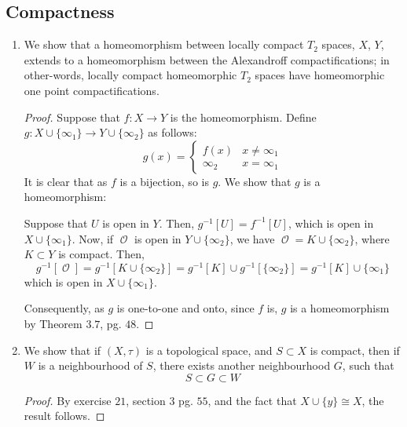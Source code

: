 \documentclass{book}
\DeclareMathOperator*{\Ocal}{\mathcal{O}}
\begin{document}
\subsection{Compactness}
\begin{enumerate}[(1)]

    \item We show that a homeomorphism between locally compact $T_2$ spaces, $X$, $Y$, extends to a homeomorphism between the Alexandroff compactifications; in other-words, locally compact homeomorphic $T_2$ spaces have homeomorphic one point compactifications. 
        \begin{proof} Suppose that $f: X \rightarrow Y$ is the homeomorphism. Define $g: X \cup \{\infty_1\} \rightarrow Y \cup \{\infty_2\}$ as follows: 
            $$ g(x) = 
            \begin{cases} 
                f(x) & x \neq \infty_1 \\
                \infty_2 & x = \infty_1
            \end{cases}
            $$
            It is clear that as $f$ is a bijection, so is $g$. We show that $g$ is a homeomorphism: 
            \par Suppose that $U$ is open in $Y$. Then, $g^{-1}[U] = f^{-1}[U]$, which is open in $X \cup \{\infty_1\}$. Now, if ${\Ocal}$ is open in $Y \cup \{\infty_2\}$, we have ${\Ocal} = K \cup \{\infty_2\}$, where $K \subset Y$ is compact. Then, 
            $$g^{-1}[{\Ocal}] = g^{-1}[K \cup \{\infty_2\}] = g^{-1}[K] \cup g^{-1}[\{\infty_2\}] =g^{-1}[K] \cup \{\infty_1\}$$
            which is open in $X \cup \{\infty_1\}$. 
            \par Consequently, as $g$ is one-to-one and onto, since $f$ is, $g$ is a homeomorphism by Theorem $3.7$, pg. $48$.
        \end{proof}

    \item We show that if $(X, \tau)$ is a topological space, and $S \subset X$ is compact, then if $W$ is a neighbourhood of $S$, there exists another neighbourhood $G$, such that 
        $$S \subset G \subset W$$
        \begin{proof} By exercise $21$, section $3$ pg. $55$, and the fact that $X \cup \{y\} \cong X$, the result follows.  
        \end{proof}

\end{enumerate}
\end{document}
